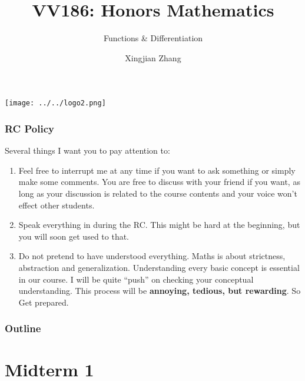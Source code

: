 \documentclass[10pt, t]{beamer}
\title{VV186: Honors Mathematics}
\subtitle{Functions \& Differentiation}
\institute[UM-SJTU JI]{Univerity of Michigan-Shanghai Jiao Tong University Joint Institute}
\author{Xingjian Zhang}
\newcommand{\alarm}[1]{{\color{bladerunnerred}{#1}}}
\begin{document}
\begin{frame}
    \titlepage
    \begin{center}
        \texttt{[image: ../../logo2.png]}
    \end{center}
\end{frame}

\begin{frame}
    \frametitle{RC Policy}
    Several things I want you to pay attention to:
    \begin{enumerate}
        \item \alarm{Be interactive.} Feel free to interrupt me at any time if you want to ask something or simply make some comments. You are free to discuss with your friend if you want, as long as your discussion is related to the course contents and your voice won't effect other students.
        \item Speak everything in \alarm{English} during the RC. This might be hard at the beginning, but you will soon get used to that.
        \item \alarm{``Question everything.''} Do not pretend to have understood everything. Maths is about strictness, abstraction and generalization. Understanding every basic concept is essential in our course. I will be quite ``push'' on checking your conceptual understanding. This process will be \textbf{annoying, tedious, but rewarding}. So Get prepared.
    \end{enumerate}
\end{frame}

\begin{frame}
    \frametitle{Outline}
    \begin{spacing}{1}
        \tableofcontents
    \end{spacing}
\end{frame}

\section{Midterm 1}
\end{document}
